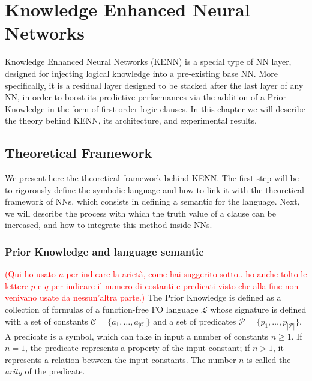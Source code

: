
\chapter{Knowledge Enhanced Neural Networks}\label{chapt:kenn}
Knowledge Enhanced Neural Networks (KENN) \cite{daniele2019kenn} is a special type of NN layer, designed for injecting logical knowledge into a pre-existing base NN. More specifically, it is a residual layer designed to be stacked after the last layer of any NN, in order to boost its predictive performances via the addition of a Prior Knowledge in the form of first order logic clauses. In this chapter we will describe the theory behind KENN, its architecture, and experimental results.

\section{Theoretical Framework}\label{sec:kenn_theoretical_framework}
 We present here the theoretical framework behind KENN. The first step will be to rigorously define the symbolic language and how to link it with the theoretical framework of NNs, which consists in defining a semantic for the language. Next, we will describe the process with which the truth value of a clause can be increased, and how to integrate this method inside NNs.
 
 \subsection{Prior Knowledge and language semantic}

\begin{definition}
	
\textcolor{red}{
(Qui ho usato $n$ per indicare la arietà, come hai suggerito sotto.. ho anche tolto le lettere $p$ e $q$ per indicare il numero di costanti e predicati visto che alla fine non venivano usate da nessun'altra parte.)}
\textcolor{unipd}{
	The Prior Knowledge is defined as a collection of formulas of a function-free FO language $\mathcal{L}$ whose signature is defined with a set of constants $\mathcal{C} = \{a_1, \dots, a_{|\mathcal{C}|}\}$ and a set of predicates $\mathcal{P} = \{p_1, \dots, p_{|\mathcal{P}|}\}$. 
	A predicate is a symbol, which can take in input a number of constants $n \geq 1$. If $n=1$, the predicate represents a property of the input constant; if $n>1$, it represents a relation between the input constants. The number $n$ is called the \textit{arity} of the predicate.}
\end{definition}

